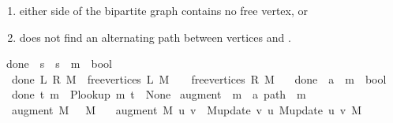 \begin{isabellebody}
\begin{isamarkuptext}
%
\begin{enumerate}%
\item either side of the bipartite graph contains no free vertex, or

\item {} does not find an alternating path between vertices  and .%
\end{enumerate}%
\end{isamarkuptext}\isamarkuptrue%
\isamarkupfalse%
\ done{\isacharunderscore}{\kern0pt}{}\ {\isacharcolon}{\kern0pt}{\isacharcolon}{\kern0pt}\ {\isachardoublequoteopen}{\isacharprime}{\kern0pt}s\ {\isasymRightarrow}\ {\isacharprime}{\kern0pt}s\ {\isasymRightarrow}\ {\isacharprime}{\kern0pt}m\ {\isasymRightarrow}\ bool{\isachardoublequoteclose}\ \isanewline
\ \ {\isachardoublequoteopen}done{\isacharunderscore}{\kern0pt}{}\ L\ R\ M\ {\isasymequiv}\ free{\isacharunderscore}{\kern0pt}vertices\ L\ M\ {\isacharequal}{\kern0pt}\ {\isacharbrackleft}{\kern0pt}{\isacharbrackright}{\kern0pt}\ {\isasymor}\ free{\isacharunderscore}{\kern0pt}vertices\ R\ M\ {\isacharequal}{\kern0pt}\ {\isacharbrackleft}{\kern0pt}{\isacharbrackright}{\kern0pt}{\isachardoublequoteclose}\isanewline
\isanewline
{}\isamarkupfalse%
\ done{\isacharunderscore}{\kern0pt}{}\ {\isacharcolon}{\kern0pt}{\isacharcolon}{\kern0pt}\ {\isachardoublequoteopen}{\isacharprime}{\kern0pt}a\ {\isasymRightarrow}\ {\isacharprime}{\kern0pt}m\ {\isasymRightarrow}\ bool{\isachardoublequoteclose}\ \isanewline
\ \ {\isachardoublequoteopen}done{\isacharunderscore}{\kern0pt}{}\ t\ m\ {\isasymequiv}\ P{\isacharunderscore}{\kern0pt}lookup\ m\ t\ {\isacharequal}{\kern0pt}\ None{\isachardoublequoteclose}\isanewline
\isanewline
\isanewline
{}\isamarkupfalse%
\ augment\ {\isacharcolon}{\kern0pt}{\isacharcolon}{\kern0pt}\ {\isachardoublequoteopen}{\isacharprime}{\kern0pt}m\ {\isasymRightarrow}\ {\isacharprime}{\kern0pt}a\ path\ {\isasymRightarrow}\ {\isacharprime}{\kern0pt}m{\isachardoublequoteclose}\ \isanewline
\ \ {\isachardoublequoteopen}augment\ M\ {\isacharbrackleft}{\kern0pt}{\isacharbrackright}{\kern0pt}\ {\isacharequal}{\kern0pt}\ M{\isachardoublequoteclose}\ {\isacharbar}{\kern0pt}\isanewline
\ \ {\isachardoublequoteopen}augment\ M\ {\isacharbrackleft}{\kern0pt}u{\isacharcomma}{\kern0pt}\ v{\isacharbrackright}{\kern0pt}\ {\isacharequal}{\kern0pt}\ {\isacharparenleft}{\kern0pt}M{\isacharunderscore}{\kern0pt}update\ v\ u\ {\isacharparenleft}{\kern0pt}M{\isacharunderscore}{\kern0pt}update\ u\ v\ M{\isacharparenright}{\kern0pt}{\isacharparenright}{\kern0pt}{\isachardoublequoteclose}\ {\isacharbar}{\kern0pt}\isanewline

\end{isabellebody}
